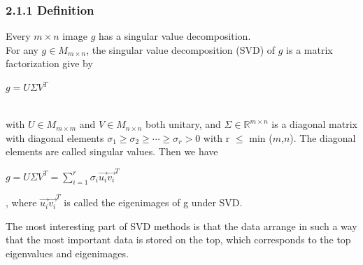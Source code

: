 \documentclass[12pt]{article}
\begin{document}
\subsubsection*{2.1.1 \quad Definition}
Every $m\times n$ image $g$ has a singular value decomposition.\\
For any $g \in M_{m \times n}$, the singular value decomposition (SVD) of $g$ is
 a matrix factorization give by \\
 \centerline{$g = U \Sigma V^T$}\\
 with $U \in M_{m \times m}$ and $V \in M_{n \times n}$ both unitary, and $\Sigma \in 
 \mathbb{R}^{m \times n}$ is a diagonal matrix with diagonal elements 
 $\sigma_1 \geq\sigma_2\geq\cdots\geq\sigma_r > 0$ with r $\leq$ min ($m$,$n$). 
The diagonal elements are called singular values. 
Then we have\\
\centerline{$g = U \Sigma V^T = \sum\limits_{i=1}^{r}\sigma_i \vec{u_i}\vec{v_i}^T$},
where $\vec{u_i}\vec{v_i}^T$ is called the eigenimages of g under SVD.

\noindent
The most interesting part of SVD methods is that the data arrange in such a way that the most 
important data is stored on the top, which corresponds to the top eigenvalues and eigenimages.
\end{document}
